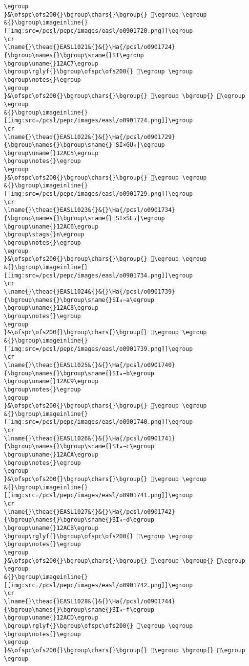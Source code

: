 \begin{verbatim}
\egroup
}&\ofspc\ofs200{}\bgroup\chars{}\bgroup{} 𒫃\egroup \egroup
&{}\bgroup\imageinline{}[[img:src=/pcsl/pepc/images/easl/o0901720.png]]\egroup
\cr
\lname{}\thead{}EASL1021&{}&{}\Ha{/pcsl/o0901724}{\bgroup\names{}\bgroup\sname{}SI\egroup
\bgroup\uname{}12AC7\egroup
\bgroup\rglyf{}\bgroup\ofspc\ofs200{} 𒫇\egroup \egroup
\bgroup\notes{}\egroup
\egroup
}&\ofspc\ofs200{}\bgroup\chars{}\bgroup{} 𒫄\egroup \bgroup{} 𒫇\egroup \egroup
&{}\bgroup\imageinline{}[[img:src=/pcsl/pepc/images/easl/o0901724.png]]\egroup
\cr
\lname{}\thead{}EASL1022&{}&{}\Ha{/pcsl/o0901729}{\bgroup\names{}\bgroup\sname{}|SI×GU₄|\egroup
\bgroup\uname{}12AC5\egroup
\bgroup\notes{}\egroup
\egroup
}&\ofspc\ofs200{}\bgroup\chars{}\bgroup{} 𒫅\egroup \egroup
&{}\bgroup\imageinline{}[[img:src=/pcsl/pepc/images/easl/o0901729.png]]\egroup
\cr
\lname{}\thead{}EASL1023&{}&{}\Ha{/pcsl/o0901734}{\bgroup\names{}\bgroup\sname{}|SI×ŠE₃|\egroup
\bgroup\uname{}12AC6\egroup
\bgroup\stags{}n\egroup
\bgroup\notes{}\egroup
\egroup
}&\ofspc\ofs200{}\bgroup\chars{}\bgroup{} 𒫆\egroup \egroup
&{}\bgroup\imageinline{}[[img:src=/pcsl/pepc/images/easl/o0901734.png]]\egroup
\cr
\lname{}\thead{}EASL1024&{}&{}\Ha{/pcsl/o0901739}{\bgroup\names{}\bgroup\sname{}SI₄∼a\egroup
\bgroup\uname{}12AC8\egroup
\bgroup\notes{}\egroup
\egroup
}&\ofspc\ofs200{}\bgroup\chars{}\bgroup{} 𒫈\egroup \egroup
&{}\bgroup\imageinline{}[[img:src=/pcsl/pepc/images/easl/o0901739.png]]\egroup
\cr
\lname{}\thead{}EASL1025&{}&{}\Ha{/pcsl/o0901740}{\bgroup\names{}\bgroup\sname{}SI₄∼b\egroup
\bgroup\uname{}12AC9\egroup
\bgroup\notes{}\egroup
\egroup
}&\ofspc\ofs200{}\bgroup\chars{}\bgroup{} 𒫉\egroup \egroup
&{}\bgroup\imageinline{}[[img:src=/pcsl/pepc/images/easl/o0901740.png]]\egroup
\cr
\lname{}\thead{}EASL1026&{}&{}\Ha{/pcsl/o0901741}{\bgroup\names{}\bgroup\sname{}SI₄∼c\egroup
\bgroup\uname{}12ACA\egroup
\bgroup\notes{}\egroup
\egroup
}&\ofspc\ofs200{}\bgroup\chars{}\bgroup{} 𒫊\egroup \egroup
&{}\bgroup\imageinline{}[[img:src=/pcsl/pepc/images/easl/o0901741.png]]\egroup
\cr
\lname{}\thead{}EASL1027&{}&{}\Ha{/pcsl/o0901742}{\bgroup\names{}\bgroup\sname{}SI₄∼d\egroup
\bgroup\uname{}12ACB\egroup
\bgroup\rglyf{}\bgroup\ofspc\ofs200{} 𒫋\egroup \egroup
\bgroup\notes{}\egroup
\egroup
}&\ofspc\ofs200{}\bgroup\chars{}\bgroup{} 𒫋\egroup \bgroup{} 𒫌\egroup \egroup
&{}\bgroup\imageinline{}[[img:src=/pcsl/pepc/images/easl/o0901742.png]]\egroup
\cr
\lname{}\thead{}EASL1028&{}&{}\Ha{/pcsl/o0901744}{\bgroup\names{}\bgroup\sname{}SI₄∼f\egroup
\bgroup\uname{}12ACD\egroup
\bgroup\rglyf{}\bgroup\ofspc\ofs200{} 𒫍\egroup \egroup
\bgroup\notes{}\egroup
\egroup
}&\ofspc\ofs200{}\bgroup\chars{}\bgroup{} 𒫍\egroup \bgroup{} 𒫎\egroup \egroup

\end{verbatim}
